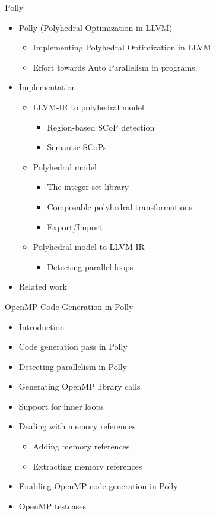 \documentclass{beamer}
\begin{document}
\begin{frame}{Polly}
\begin{itemize}
\item Polly (Polyhedral Optimization in LLVM)
	\begin{itemize}
	\item Implementing Polyhedral Optimization in LLVM
	\item Effort towards Auto Parallelism in programs.
	\end{itemize}
\item Implementation
	\begin{itemize}
	\item LLVM-IR to polyhedral model
			\begin{itemize}
			\item Region-based SCoP detection
			\item Semantic SCoPs
			\end{itemize}
	\item Polyhedral model
		\begin{itemize}
		\item The integer set library
		\item Composable polyhedral transformations
		\item Export/Import
		\end{itemize}
	\item Polyhedral model to LLVM-IR
		\begin{itemize}
		\item Detecting parallel loops
		\end{itemize}
	\end{itemize}
\item Related work
\end{itemize}
\end{frame}

\begin{frame}{OpenMP Code Generation in Polly}
\begin{itemize}
\item Introduction
\item Code generation pass in Polly
\item Detecting parallelism in Polly
\item Generating OpenMP library calls
\item Support for inner loops
\item Dealing with memory references
	\begin{itemize}
	\item Adding memory references
	\item Extracting memory references
	\end{itemize}
\item Enabling OpenMP code generation in Polly
\item OpenMP testcases
\end{itemize}
\end{frame}
\end{document}
